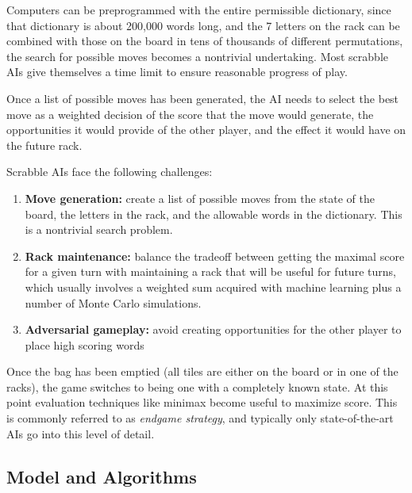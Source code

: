 \documentclass[12pt]{article}
\begin{document}
Computers can be preprogrammed with the entire permissible dictionary,
since that dictionary is about 200,000 words long, and the 7 letters
on the rack can be combined with those on the board in tens of
thousands of different permutations, the search for possible moves
becomes a nontrivial undertaking. Most scrabble AIs give themselves a
time limit to ensure reasonable progress of play.

Once a list of possible moves has been generated, the AI needs to
select the best move as a weighted decision of the score that the move
would generate, the opportunities it would provide of the other
player, and the effect it would have on the future rack.

Scrabble AIs face the following challenges:
\begin{enumerate}
  \item \textbf{Move generation:} create a list of possible moves from
    the state of the board, the letters in the rack, and the allowable
    words in the dictionary. This is a nontrivial search problem.
    
  \item \textbf{Rack maintenance:} balance the tradeoff between getting
    the maximal score for a given turn with maintaining a rack that
    will be useful for future turns, which usually involves a weighted
    sum acquired with machine learning plus a number of Monte Carlo
    simulations.
    
  \item \textbf{Adversarial gameplay:} avoid creating opportunities
    for the other player to place high scoring words 
\end{enumerate}

Once the bag has been emptied (all tiles are either on the board or in
one of the racks), the game switches to being one with a completely
known state. At this point evaluation techniques like minimax become
useful to maximize score. This is commonly referred to as
\emph{endgame strategy}, and typically only state-of-the-art AIs go
into this level of detail.

\subsection*{Model and Algorithms}
\end{document}
